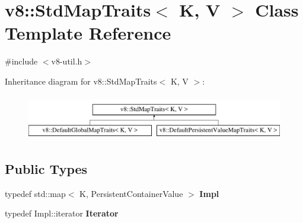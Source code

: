 \hypertarget{classv8_1_1StdMapTraits}{}\section{v8\+:\+:Std\+Map\+Traits$<$ K, V $>$ Class Template Reference}
\label{classv8_1_1StdMapTraits}


{\ttfamily \#include $<$v8-\/util.\+h$>$}

Inheritance diagram for v8\+:\+:Std\+Map\+Traits$<$ K, V $>$\+:\begin{figure}[H]
\begin{center}
\leavevmode
\includegraphics[height=2.000000cm]{classv8_1_1StdMapTraits}
\end{center}
\end{figure}
\subsection*{Public Types}
\begin{DoxyCompactItemize}
\item 
\mbox{\label{classv8_1_1StdMapTraits_ac64cb78b3ef5cfbc35cf03837552e4ea}} 
typedef std\+::map$<$ K, Persistent\+Container\+Value $>$ {\bfseries Impl}
\item 
\mbox{\label{classv8_1_1StdMapTraits_ad20ef2022e83bfba6dcee23a2a34098e}} 
typedef Impl\+::iterator {\bfseries Iterator}
\end{DoxyCompactItemize}
